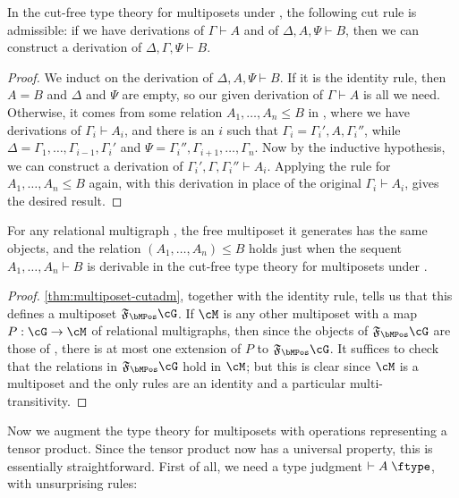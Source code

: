\documentclass{book}
\let\types\vdash
\def\type{\;\ftype}
\newcommand{\F}[1]{\mathfrak{F}_{#1}}
\def\one{\mathbf{1}}
\let\tensor\otimes
\begin{document}
\begin{thm}\label{thm:multiposet-cutadm}
  In the cut-free type theory for multiposets under \cG, the following cut rule is admissible: if we have derivations of $\Gamma\types A$ and of $\Delta,A,\Psi\types B$, then we can construct a derivation of $\Delta,\Gamma,\Psi\types B$.
\end{thm}
\begin{proof}
  We induct on the derivation of $\Delta,A,\Psi\types B$.
  If it is the identity rule, then $A=B$ and $\Delta$ and $\Psi$ are empty, so our given derivation of $\Gamma\types A$ is all we need.
  Otherwise, it comes from some relation $A_1,\dots,A_n \le B$ in \cG, where we have derivations of $\Gamma_i \types A_i$, and there is an $i$ such that $\Gamma_i = \Gamma_i',A,\Gamma_i''$, while $\Delta = \Gamma_1,\dots,\Gamma_{i-1},\Gamma_i'$ and $\Psi = \Gamma_i'',\Gamma_{i+1},\dots,\Gamma_n$.
  Now by the inductive hypothesis, we can construct a derivation of $\Gamma_i',\Gamma,\Gamma_i''\types A_i$.
  Applying the rule for $A_1,\dots,A_n \le B$ again, with this derivation in place of the original $\Gamma_i \types A_i$, gives the desired result.
\end{proof}

\begin{thm}\label{thm:multiposet-initial}
  For any relational multigraph \cG, the free multiposet it generates has the same objects, and the relation $(A_1,\dots,A_n)\le B$ holds just when the sequent $A_1,\dots,A_n\types B$ is derivable in the cut-free type theory for multiposets under \cG.
\end{thm}
\begin{proof}
  \cref{thm:multiposet-cutadm}, together with the identity rule, tells us that this defines a multiposet $\F\bMPos\cG$.
  If $\cM$ is any other multiposet with a map $P:\cG\to\cM$ of relational multigraphs, then since the objects of $\F\bMPos\cG$ are those of \cG, there is at most one extension of $P$ to $\F\bMPos\cG$.
  It suffices to check that the relations in $\F\bMPos\cG$ hold in $\cM$; but this is clear since $\cM$ is a multiposet and the only rules are an identity and a particular multi-transitivity.
\end{proof}

Now we augment the type theory for multiposets with operations representing a tensor product.
Since the tensor product now has a universal property, this is essentially straightforward.
First of all, we need a type judgment $\types A\type$, with unsurprising rules:
\end{document}
